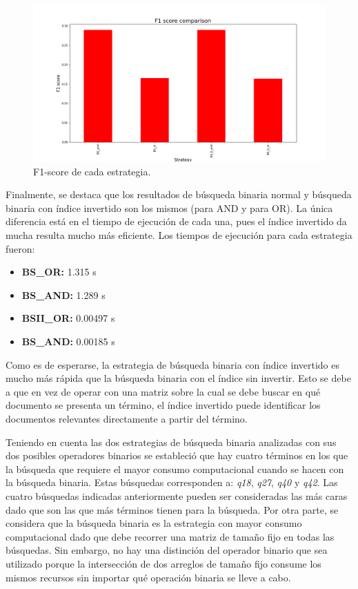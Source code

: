 \begin{figure}[H]
    \centering
    \includegraphics[width=\textwidth]{results/images/BS_f1_comparison.png}
    \caption{F1-score de cada estrategia.}
    \label{fig:F1-score}
\end{figure}

Finalmente, se destaca que los resultados de búsqueda binaria normal y búsqueda binaria con índice invertido son los mismos (para AND y para OR). La única diferencia está en el tiempo de ejecución de cada una, pues el índice invertido da mucha resulta mucho más eficiente. Los tiempos de ejecución para cada estrategia fueron:

\begin{itemize}
    \item \textbf{BS\_OR:} 1.315 s
    \item \textbf{BS\_AND:} 1.289 s
    \item \textbf{BSII\_OR:} 0.00497 s
    \item \textbf{BS\_AND:} 0.00185 s
\end{itemize}

Como es de esperarse, la estrategia de búsqueda binaria con índice invertido es mucho más rápida que la búsqueda binaria con el índice sin invertir. Esto se debe a que en vez de operar con una matriz sobre la cual se debe buscar en qué documento se presenta un término, el índice invertido puede identificar los documentos relevantes directamente a partir del término. 

Teniendo en cuenta las dos estrategias de búsqueda binaria analizadas con sus dos posibles operadores binarios se estableció que hay cuatro términos en los que la búsqueda que requiere el mayor consumo computacional cuando se hacen con la búsqueda binaria. Estas búsquedas corresponden a: \textit{q18}, \textit{q27}, \textit{q40} y \textit{q42}. Las cuatro búsquedas indicadas anteriormente pueden ser consideradas las más caras dado que son las que más términos tienen para la búsqueda. Por otra parte, se considera que la búsqueda binaria es la estrategia con mayor consumo computacional dado que debe recorrer una matriz de tamaño fijo en todas las búsquedas. Sin embargo, no hay una distinción del operador binario que sea utilizado porque la intersección de dos arreglos de tamaño fijo consume los mismos recursos sin importar qué operación binaria se lleve a cabo.

